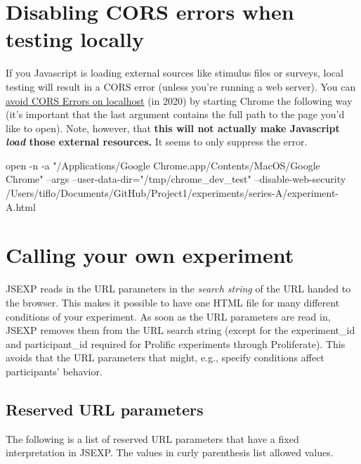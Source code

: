 \documentclass{article}
\newenvironment{code}%
   {\par\noindent\adjustbox{margin=1ex,bgcolor=shadecolor,margin=0ex \medskipamount}\bgroup\minipage\linewidth\codewrap}%
   {\endcodewrap\endminipage\egroup}
\begin{document}
\section{Disabling CORS errors when testing locally}
If you Javascript is loading external sources like stimulus files or surveys, local testing will result in a CORS error (unless you're running a web server). You can \href{https://medium.com/swlh/avoiding-cors-errors-on-localhost-in-2020-5a656ed8cefa}{avoid CORS Errors on localhost} (in 2020) by starting Chrome the following way (it's important that the last argument contains the full path to the page you'd like to open). Note, however, that {\bf this will not actually make Javascript {\em load} those external resources.} It seems to only suppress the error.

\begin{code}
open -n -a "/Applications/Google Chrome.app/Contents/MacOS/Google Chrome" --args --user-data-dir="/tmp/chrome_dev_test" --disable-web-security /Users/tiflo/Documents/GitHub/Project1/experiments/series-A/experiment-A.html
\end{code}


\section{Calling your own experiment}
JSEXP reads in the URL parameters in the {\em search string} of the URL handed to the browser. This makes it possible to have one HTML file for many different conditions of your experiment. As soon as the URL parameters are read in, JSEXP removes them from the URL search string (except for the experiment\_id and participant\_id required for Prolific experiments through Proliferate). This avoids that the URL parameters that might, e.g., specify conditions affect participants' behavior. 

\subsection{Reserved URL parameters}
The following is a list of reserved URL parameters that have a fixed interpretation in JSEXP. The values in curly parenthesis list allowed values.
\end{document}
